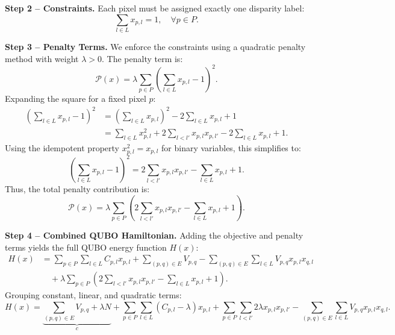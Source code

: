 \documentclass[12pt]{article}
\begin{document}
\textbf{Step 2 -- Constraints.}
Each pixel must be assigned exactly one disparity label:
\begin{equation}
\sum_{l \in L} x_{p,l} = 1, \quad \forall p \in P.
\end{equation}

\textbf{Step 3 -- Penalty Terms.}
We enforce the constraints using a quadratic penalty method with weight $\lambda > 0$. The penalty term is:
\begin{equation}
\mathcal{P}(x) = \lambda \sum_{p \in P} \left( \sum_{l \in L} x_{p,l} - 1 \right)^2.
\end{equation}
Expanding the square for a fixed pixel $p$:
\begin{align}
\left( \sum_{l \in L} x_{p,l} - 1 \right)^2 &= \left( \sum_{l \in L} x_{p,l} \right)^2 - 2 \sum_{l \in L} x_{p,l} + 1 \\
&= \sum_{l \in L} x_{p,l}^2 + 2 \sum_{l < l'} x_{p,l} x_{p,l'} - 2 \sum_{l \in L} x_{p,l} + 1.
\end{align}
Using the idempotent property $x_{p,l}^2 = x_{p,l}$ for binary variables, this simplifies to:
\begin{equation}
\left( \sum_{l \in L} x_{p,l} - 1 \right)^2 = 2 \sum_{l < l'} x_{p,l} x_{p,l'} - \sum_{l \in L} x_{p,l} + 1.
\end{equation}
Thus, the total penalty contribution is:
\begin{equation}
\mathcal{P}(x) = \lambda \sum_{p \in P} \left( 2 \sum_{l < l'} x_{p,l} x_{p,l'} - \sum_{l \in L} x_{p,l} + 1 \right).
\end{equation}

\textbf{Step 4 -- Combined QUBO Hamiltonian.}
Adding the objective and penalty terms yields the full QUBO energy function $H(x)$:
\begin{align}
H(x) &= \sum_{p \in P} \sum_{l \in L} C_{p,l} x_{p,l} + \sum_{(p,q) \in E} V_{p,q} - \sum_{(p,q) \in E} \sum_{l \in L} V_{p,q} x_{p,l} x_{q,l} \nonumber \\
&\quad + \lambda \sum_{p \in P} \left( 2 \sum_{l < l'} x_{p,l} x_{p,l'} - \sum_{l \in L} x_{p,l} + 1 \right).
\end{align}
Grouping constant, linear, and quadratic terms:
\begin{equation}
H(x) = \underbrace{\sum_{(p,q) \in E} V_{p,q} + \lambda N}_{c} + \sum_{p \in P} \sum_{l \in L} \left( C_{p,l} - \lambda \right) x_{p,l} + \sum_{p \in P} \sum_{l < l'} 2\lambda x_{p,l} x_{p,l'} - \sum_{(p,q) \in E} \sum_{l \in L} V_{p,q} x_{p,l} x_{q,l}.
\end{equation}
\end{document}
